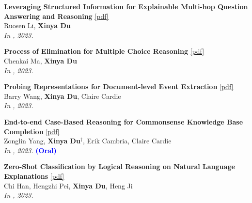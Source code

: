 \begin{enumerate}[{[}1{]},resume,leftmargin=*]
\parbox{\linewidth}{
\item
 
{\bf Leveraging Structured Information for Explainable Multi-hop Question Answering and Reasoning} 
\href{https://aclanthology.org/2023.findings-emnlp.452.pdf}{{[pdf]}} \\
Ruosen Li, \textbf{Xinya Du} \\
{\it In \EMNLPfinding, 2023.} \\
}

\parbox{\linewidth}{
\item
 
{\bf Process of Elimination for Multiple Choice Reasoning} 
\href{https://aclanthology.org/2023.emnlp-main.273.pdf}{{[pdf]}} \\
Chenkai Ma, \textbf{Xinya Du} \\
{\it In \EMNLP, 2023.} \\
}

\parbox{\linewidth}{
\item
 
{\bf Probing Representations for Document-level Event Extraction} 
\href{https://aclanthology.org/2023.findings-emnlp.844.pdf}{{[pdf]}} \\
Barry Wang, \textbf{Xinya Du}, Claire Cardie \\
{\it In \EMNLPfinding, 2023.} \\
}

\parbox{\linewidth}{
\item
 
{\bf End-to-end Case-Based Reasoning for Commonsense Knowledge Base Completion} 
\href{https://aclanthology.org/2023.eacl-main.255.pdf}{{[pdf]}} \\
Zonglin Yang, \textbf{Xinya Du}$^{\dagger}$, Erik Cambria, Claire Cardie \\
{\it In \EACL, 2023.} {\textcolor{blue}{\textbf{(Oral)}}} \\ 
}

\parbox{\linewidth}{
\item
 
{\bf Zero-Shot Classification by Logical Reasoning on Natural Language Explanations} 
\href{https://aclanthology.org/2023.findings-acl.571.pdf}{{[pdf]}} \\
Chi Han, Hengzhi Pei, \textbf{Xinya Du}, Heng Ji \\
{\it In \ACLfinding, 2023.}\\
}

\parbox{\linewidth}{
\item
 
}
\end{enumerate}
